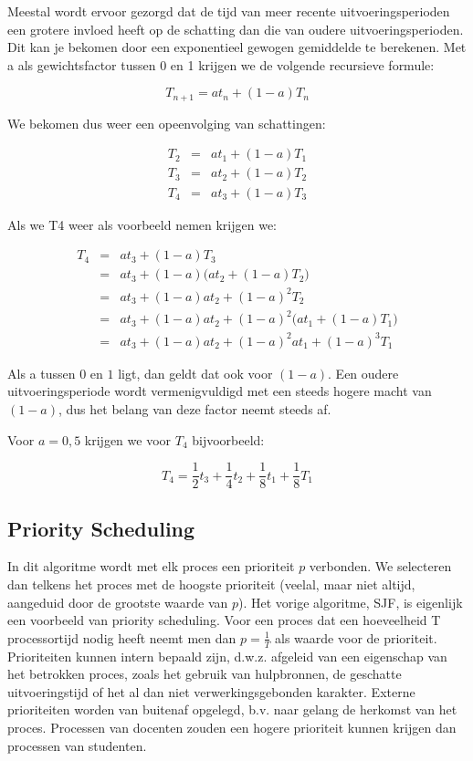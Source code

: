 Meestal wordt ervoor gezorgd dat de tijd van meer recente
uitvoeringsperioden een grotere invloed heeft op de schatting dan die
van oudere uitvoeringsperioden. Dit kan je bekomen door een
exponentieel gewogen gemiddelde te berekenen. Met a als gewichtsfactor
tussen 0 en 1 krijgen we de volgende recursieve formule:

\begin{displaymath}
T_{n+1} = at_n + (1-a)T_n
\end{displaymath}


We bekomen dus weer een opeenvolging van schattingen:

\begin{eqnarray*}
T_2 & = & at_1 + (1-a)T_1 \\
T_3 & = & at_2 + (1-a)T_2 \\
T_4 & = & at_3 + (1-a)T_3
\end{eqnarray*}

Als we T4 weer als voorbeeld nemen krijgen we:

\begin{eqnarray*}
T_4 & = & at_3 + (1-a)T_3 \\
    & = & at_3 + (1-a)\Big(at_2 + (1-a)T_2\Big) \\
    & = & at_3 + (1-a)at_2 + (1-a)^2T_2 \\
    & = & at_3 + (1-a)at_2 + (1-a)^2\Big(at_1 + (1-a)T_1\Big) \\
    & = & at_3 + (1-a)at_2 + (1-a)^2at_1 + (1-a)^3T_1
\end{eqnarray*}


Als a tussen $0$ en $1$ ligt, dan geldt dat ook voor $(1-a)$. Een
oudere uitvoeringsperiode wordt vermenigvuldigd met een steeds hogere
macht van $(1-a)$, dus het belang van deze factor neemt steeds
af.

Voor $a=0,5$ krijgen we voor $T_4$ bijvoorbeeld:

\begin{displaymath}
T_4 = \frac{1}{2}t_3 + \frac{1}{4}t_2 + \frac{1}{8}t_1 + \frac{1}{8}T_1
\end{displaymath}


\subsection{Priority Scheduling}

In dit algoritme wordt met elk proces een prioriteit $p$
verbonden. We selecteren dan telkens het proces met de hoogste
prioriteit (veelal, maar niet altijd, aangeduid door de grootste
waarde van $p$). Het vorige algoritme, SJF, is eigenlijk een voorbeeld
van priority scheduling. Voor een proces dat een hoeveelheid T processortijd
nodig heeft neemt men dan $p = \frac{1}{T}$ als waarde voor de prioriteit.
Prioriteiten kunnen intern bepaald zijn, d.w.z. afgeleid van een eigenschap van
het betrokken proces, zoals het gebruik van hulpbronnen, de geschatte
uitvoeringstijd of het al dan niet verwerkingsgebonden karakter. Externe
prioriteiten worden van buitenaf opgelegd, b.v. naar gelang de herkomst van het
proces. Processen van docenten zouden een hogere prioriteit kunnen krijgen dan
processen van studenten.

